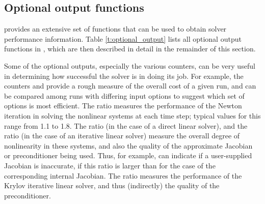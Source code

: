 \subsection{Optional output functions}\label{ss:optional_output}

{\cvode} provides an extensive set of functions that can be used to obtain
solver performance information.
Table \ref{t:optional_output} lists all optional output functions in {\cvode},
which are then described in detail in the remainder of this section.

Some of the optional outputs, especially the various counters, can be
very useful in determining how successful the {\cvode} solver is in
doing its job.  For example, the counters  and 
provide a rough measure of the overall cost of a given run, and can be
compared among runs with differing input options to suggest which set
of options is most efficient.  The ratio  measures
the performance of the Newton iteration in solving the nonlinear
systems at each time step; typical values for this range from 1.1 to
1.8.  The ratio  (in the case of a direct linear
solver), and the ratio  (in the case of an
iterative linear solver) measure the overall degree of nonlinearity
in these systems, and also the quality of the approximate Jacobian or
preconditioner being used.  Thus, for example, 
can indicate if a user-supplied Jacobian is inaccurate, if this ratio
is larger than for the case of the corresponding internal Jacobian.
The ratio  measures the performance of the Krylov
iterative linear solver, and thus (indirectly) the quality of the
preconditioner.

\vspace*{.2in}

\newlength{\colAA}
\settowidth{\colAA}{No. of r.h.s. calls for finite diff. Jacobian-vector evals.}
\newlength{\colBB}


